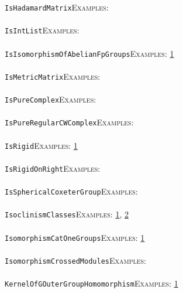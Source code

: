\documentclass[a4paper,11pt]{report}
\begin{document}
{{ \texttt{IsHadamardMatrix}{\nobreakspace}{\nobreakspace}{\nobreakspace}{\nobreakspace}\textsc{Examples:} \\
 \\
 \texttt{IsIntList}{\nobreakspace}{\nobreakspace}{\nobreakspace}{\nobreakspace}\textsc{Examples:} \\
 \\
 \texttt{IsIsomorphismOfAbelianFpGroups}{\nobreakspace}{\nobreakspace}{\nobreakspace}{\nobreakspace}\textsc{Examples:} \href{tutorial/chap1.html} {1}{\nobreakspace} \\
 \\
 \texttt{IsMetricMatrix}{\nobreakspace}{\nobreakspace}{\nobreakspace}{\nobreakspace}\textsc{Examples:} \\
 \\
 \texttt{IsPureComplex}{\nobreakspace}{\nobreakspace}{\nobreakspace}{\nobreakspace}\textsc{Examples:} \\
 \\
 \texttt{IsPureRegularCWComplex}{\nobreakspace}{\nobreakspace}{\nobreakspace}{\nobreakspace}\textsc{Examples:} \\
 \\
 \texttt{IsRigid}{\nobreakspace}{\nobreakspace}{\nobreakspace}{\nobreakspace}\textsc{Examples:} \href{tutorial/chap8.html} {1}{\nobreakspace} \\
 \\
 \texttt{IsRigidOnRight}{\nobreakspace}{\nobreakspace}{\nobreakspace}{\nobreakspace}\textsc{Examples:} \\
 \\
 \texttt{IsSphericalCoxeterGroup}{\nobreakspace}{\nobreakspace}{\nobreakspace}{\nobreakspace}\textsc{Examples:} \\
 \\
 \texttt{IsoclinismClasses}{\nobreakspace}{\nobreakspace}{\nobreakspace}{\nobreakspace}\textsc{Examples:} \href{tutorial/chap5.html} {1}{\nobreakspace}, \href{../www/SideLinks/About/aboutBogomolov.html} {2}{\nobreakspace} \\
 \\
 \texttt{IsomorphismCatOneGroups}{\nobreakspace}{\nobreakspace}{\nobreakspace}{\nobreakspace}\textsc{Examples:} \href{../www/SideLinks/About/aboutquasi.html} {1}{\nobreakspace} \\
 \\
 \texttt{IsomorphismCrossedModules}{\nobreakspace}{\nobreakspace}{\nobreakspace}{\nobreakspace}\textsc{Examples:} \\
 \\
 \texttt{KernelOfGOuterGroupHomomorphism}{\nobreakspace}{\nobreakspace}{\nobreakspace}{\nobreakspace}\textsc{Examples:} \href{../www/SideLinks/About/aboutCoefficientSequence.html} {1}{\nobreakspace} \\
}}
\end{document}
